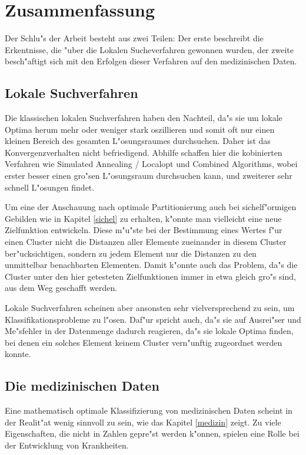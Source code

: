 \chapter{Zusammenfassung}
Der Schlu"s der Arbeit besteht aus zwei Teilen: Der erste
beschreibt die Erkentnisse, die "uber die Lokalen Sucheverfahren
gewonnen wurden, der zweite besch"aftigt sich mit den Erfolgen dieser
Verfahren auf den medizinischen Daten.

\section{Lokale Suchverfahren}

Die klassischen lokalen Suchverfahren haben den Nachteil, da"s sie um lokale
Optima herum mehr oder weniger stark oszillieren und somit oft nur 
einen kleinen Bereich des gesamten L"osungsraumes durchsuchen. Daher
ist das Konvergenzverhalten nicht befriedigend.
Abhilfe schaffen hier die kobinierten Verfahren wie Simulated Annealing / 
Localopt und Combined Algorithms, wobei erster besser einen gro"sen 
L"osungsraum durchsuchen kann, und zweiterer sehr schnell L"osungen findet.

Um eine der Anschauung nach optimale Partitionierung auch bei
sichelf"ormigen Gebilden wie in Kapitel \ref{sichel} zu erhalten, 
k"onnte man vielleicht eine neue Zielfunktion entwickeln. Diese m"u"ste 
bei der Bestimmung eines Wertes f"ur einen Cluster nicht die
Distanzen aller Elemente zueinander in diesem Cluster
ber"ucksichtigen, sondern zu jedem Element nur die Distanzen zu den 
unmittelbar benachbarten Elementen.
Damit k"onnte auch das Problem, da"s die Cluster unter den hier getesteten
Zielfunktionen immer in etwa gleich gro"s sind, aus dem Weg geschafft werden.

Lokale Suchverfahren scheinen aber ansonsten sehr vielversprechend zu sein,
um Klassifikationsprobleme zu l"osen.
Daf"ur spricht auch, da"s sie auf Ausrei"ser und Me"sfehler in der
Datenmenge dadurch reagieren, da"s sie lokale Optima finden, bei denen
ein solches Element keinem Cluster vern"unftig zugeordnet werden konnte.

\section{Die medizinischen Daten}
Eine mathematisch optimale Klassifizierung von medizinischen Daten
scheint in der Realit"at wenig sinnvoll zu sein, wie das Kapitel \ref{medizin}
zeigt. Zu viele Eigenschaften, die nicht in Zahlen gepre"st werden 
k"onnen, spielen eine Rolle bei der Entwicklung von Krankheiten.

